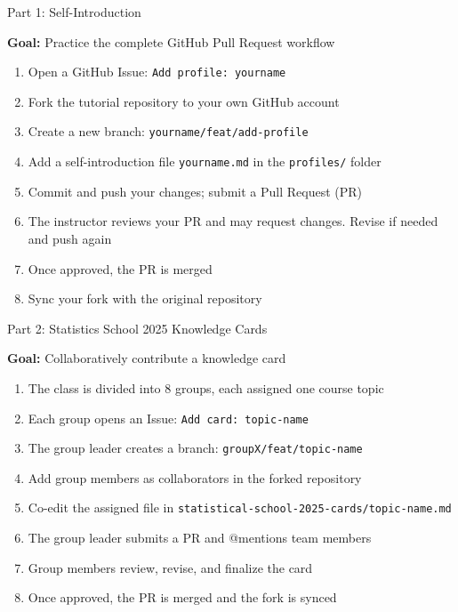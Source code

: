 \documentclass[12pt]{beamer}
\begin{document}
\begin{frame}{Part 1: Self-Introduction}

\textbf{Goal:} Practice the complete GitHub Pull Request workflow

\vspace{1em}
\begin{enumerate}
  \setlength\itemsep{0.5em}
  \item Open a GitHub Issue: \texttt{Add profile: yourname}
  \item Fork the tutorial repository to your own GitHub account
  \item Create a new branch: \texttt{yourname/feat/add-profile}
  \item Add a self-introduction file \texttt{yourname.md} in the \texttt{profiles/} folder
  \item Commit and push your changes; submit a Pull Request (PR)
  \item The instructor reviews your PR and may request changes. Revise if needed and push again
  \item Once approved, the PR is merged
  \item Sync your fork with the original repository
\end{enumerate}
\end{frame}

\begin{frame}{Part 2: Statistics School 2025 Knowledge Cards}

\textbf{Goal:} Collaboratively contribute a knowledge card

\vspace{1em}
\begin{enumerate}
  \setlength\itemsep{0.5em}
  \item The class is divided into 8 groups, each assigned one course topic
  \item Each group opens an Issue: \texttt{Add card: topic-name}
  \item The group leader creates a branch: \texttt{groupX/feat/topic-name}
  \item Add group members as collaborators in the forked repository
  \item Co-edit the assigned file in \texttt{statistical-school-2025-cards/topic-name.md}
  \item The group leader submits a PR and @mentions team members
  \item Group members review, revise, and finalize the card
  \item Once approved, the PR is merged and the fork is synced
\end{enumerate}
\end{frame}
\end{document}
